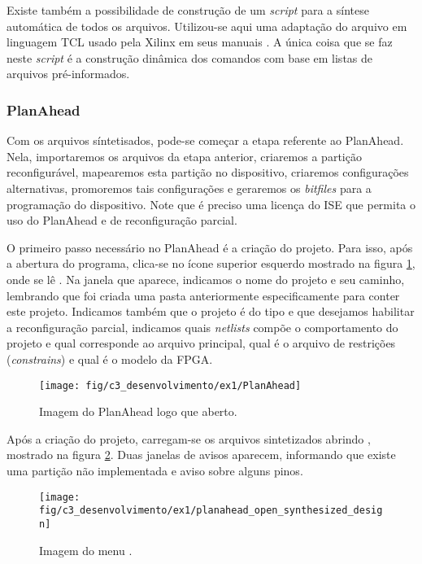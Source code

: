 \documentclass[11pt,a4paper,oneside]{book}
\begin{document}
Existe também a possibilidade de construção de um \textit{script} para a síntese automática de todos os arquivos.
Utilizou-se aqui uma adaptação do arquivo em linguagem TCL usado pela Xilinx em seus manuais \cite{ug702, ug743, ug744}.
A única coisa que se faz neste \textit{script} é a construção dinâmica dos comandos com base em listas de arquivos pré-informados.

\subsubsection{PlanAhead}
Com os arquivos síntetisados, pode-se começar a etapa referente ao PlanAhead.
Nela, importaremos os arquivos da etapa anterior, criaremos a partição reconfigurável, mapearemos esta partição no dispositivo, criaremos configurações alternativas, promoremos tais configurações e geraremos os \textit{bitfiles} para a programação do dispositivo.
Note que é preciso uma licença do ISE que permita o uso do PlanAhead e de reconfiguração parcial.

O primeiro passo necessário no PlanAhead é a criação do projeto.
Para isso, após a abertura do programa, clica-se no ícone superior esquerdo mostrado na figura \ref{fig:ex1:planahead}, onde se lê .
Na janela que aparece, indicamos o nome do projeto e seu caminho, lembrando que foi criada uma pasta anteriormente especificamente para conter este projeto.
Indicamos também que o projeto é do tipo  e que desejamos habilitar a reconfiguração parcial, indicamos quais \textit{netlists} compõe o comportamento do projeto e qual corresponde ao arquivo principal, qual é o arquivo de restrições (\textit{constrains}) e qual é o modelo da FPGA.

\begin{figure}[h]
\centering
\texttt{[image: fig/c3\_desenvolvimento/ex1/PlanAhead]}
\caption{Imagem do PlanAhead logo que aberto.}
\label{fig:ex1:planahead}
\end{figure}

Após a criação do projeto, carregam-se os arquivos sintetizados abrindo , mostrado na figura \ref{fig:ex1:planahead_open_synthesized_design}.
Duas janelas de avisos aparecem, informando que existe uma partição não implementada e aviso sobre alguns pinos.

\begin{figure}[h]
\centering
\texttt{[image: fig/c3\_desenvolvimento/ex1/planahead\_open\_synthesized\_design]}
\caption{Imagem do menu .}
\label{fig:ex1:planahead_open_synthesized_design}
\end{figure}
\end{document}
